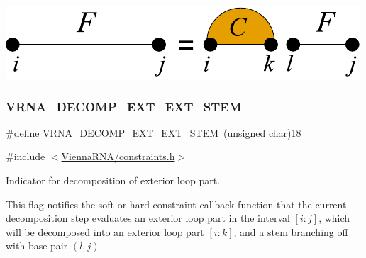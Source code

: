  
\begin{DoxyImageNoCaption}
  \mbox{\includegraphics[width=\textwidth,height=\textheight/2,keepaspectratio=true]{decomp_ext_stem_ext}}
\end{DoxyImageNoCaption}
 \mbox{\label{group__constraints_ga06efd054c9271438f6d82d4559d9e69f}} 
\subsubsection{\texorpdfstring{V\+R\+N\+A\+\_\+\+D\+E\+C\+O\+M\+P\+\_\+\+E\+X\+T\+\_\+\+E\+X\+T\+\_\+\+S\+T\+EM}{VRNA\_DECOMP\_EXT\_EXT\_STEM}}
{\footnotesize\ttfamily \#define V\+R\+N\+A\+\_\+\+D\+E\+C\+O\+M\+P\+\_\+\+E\+X\+T\+\_\+\+E\+X\+T\+\_\+\+S\+T\+EM~(unsigned char)18}



{\ttfamily \#include $<$\hyperlink{constraints_8h}{Vienna\+R\+N\+A/constraints.\+h}$>$}



Indicator for decomposition of exterior loop part. 

This flag notifies the soft or hard constraint callback function that the current decomposition step evaluates an exterior loop part in the interval $[i:j]$, which will be decomposed into an exterior loop part $[i:k]$, and a stem branching off with base pair $(l,j)$.

